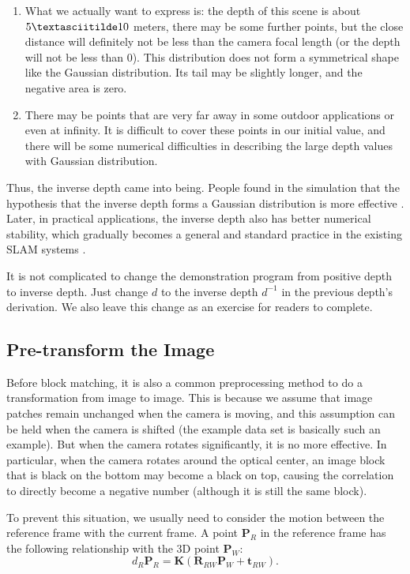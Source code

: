 \begin{enumerate}
	\item What we actually want to express is: the depth of this scene is about $5 \textasciitilde 10$ meters, there may be some further points, but the close distance will definitely not be less than the camera focal length (or the depth will not be less than 0). This distribution does not form a symmetrical shape like the Gaussian distribution. Its tail may be slightly longer, and the negative area is zero.
	\item There may be points that are very far away in some outdoor applications or even at infinity. It is difficult to cover these points in our initial value, and there will be some numerical difficulties in describing the large depth values with Gaussian distribution.
\end{enumerate}

Thus, the inverse depth came into being. People found in the simulation that the hypothesis that the inverse depth forms a Gaussian distribution is more effective {\cite{Civera2008}}. Later, in practical applications, the inverse depth also has better numerical stability, which gradually becomes a general and standard practice in the existing SLAM systems {\cite{Forster2014, Engel2014, Mur- Artal2015}}.

It is not complicated to change the demonstration program from positive depth to inverse depth. Just change $d$ to the inverse depth $d^{-1}$ in the previous depth's derivation. We also leave this change as an exercise for readers to complete.

\subsection{Pre-transform the Image}
Before block matching, it is also a common preprocessing method to do a transformation from image to image. This is because we assume that image patches remain unchanged when the camera is moving, and this assumption can be held when the camera is shifted (the example data set is basically such an example). But when the camera rotates significantly, it is no more effective. In particular, when the camera rotates around the optical center, an image block that is black on the bottom may become a black on top, causing the correlation to directly become a negative number (although it is still the same block).

To prevent this situation, we usually need to consider the motion between the reference frame with the current frame. A point $\mathbf{P}_R$ in the reference frame has the following relationship with the 3D point $\mathbf{P}_W$: 
\begin{equation}
	d_R {\mathbf{P}_R} = \mathbf{K} \left( {{\mathbf{R}_{{RW}}}{\mathbf{P}_W} + {\mathbf{t}_{{RW}}}} \right).
\end{equation}

